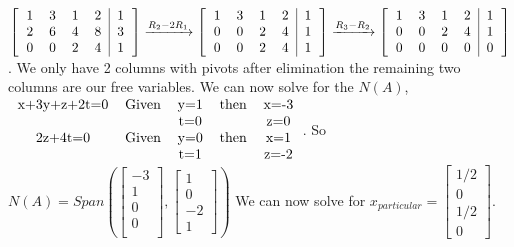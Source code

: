 $\begin{bmatrix} \begin{tabular}{cccc|c}
		1 & 3 & 1 & 2 & 1 \\
		2 & 6 & 4 & 8 & 3 \\
		0 & 0 & 2 & 4 & 1 \\
		\end{tabular} \end{bmatrix}
		\xrightarrow{R_2-2R_1}
		\begin{bmatrix} \begin{tabular}{cccc|c}
		1 & 3 & 1 & 2 & 1 \\
		0 & 0 & 2 & 4 & 1 \\
		0 & 0 & 2 & 4 & 1 \\
		\end{tabular} \end{bmatrix}
		\xrightarrow{R_3-R_2}
		\begin{bmatrix} \begin{tabular}{cccc|c}
		1 & 3 & 1 & 2 & 1 \\
		0 & 0 & 2 & 4 & 1 \\
		0 & 0 & 0 & 0 & 0 \\
		\end{tabular} \end{bmatrix}$.
		We only have 2 columns with pivots after elimination the remaining two columns are our free variables. We can now solve for the $N(A)$,
		\newline
	    $\begin{tabular}{ccccc}
		x+3y+z+2t=0 & Given & y=1 & then & x=-3 \\ 
		 & & t=0 &  & z=0 \\
		2z+4t=0 & Given & y=0 & then & x=1 \\ 
		 & & t=1 &  & z=-2 \end{tabular}$.
		 \newline
		 So $N(A)=Span \left( 
		 \begin{bmatrix} -3 \\ 1 \\ 0 \\ 0 \\ \end{bmatrix}, 
		 \begin{bmatrix} 1 \\ 0 \\ -2 \\ 1 \end{bmatrix}\right)$
		\newline
		We can now solve for $x_{particular}=\begin{bmatrix} 1/2 \\ 0 \\ 1/2 \\ 0 \end{bmatrix}$.  
